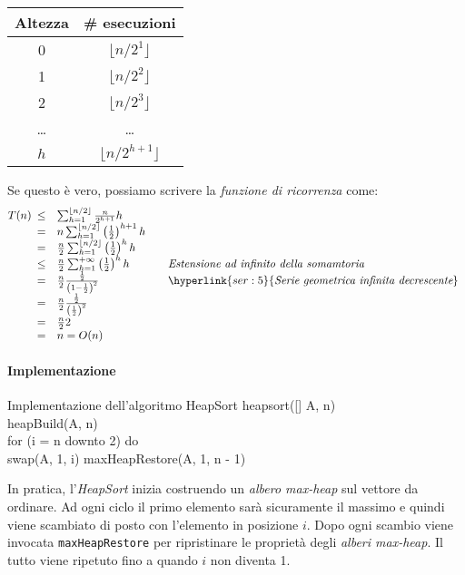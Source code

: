 \begin{table}[h!]
    \centering
    \renewcommand{\arraystretch}{1.2}
    \begin{tabular}{|c|c|}
        \hline
        \textbf{Altezza} & \textbf{\# esecuzioni}\\
        \hline
        0 & $\lfloor n/2^1\rfloor$\\
        \hline
        1 & $\lfloor n/2^2\rfloor$\\
        \hline
        2 & $\lfloor n/2^3\rfloor$\\
        \hline
        \dots & \dots\\
        \hline
        $h$ & $\lfloor n/2^{h+1}\rfloor$\\
        \hline
    \end{tabular}
\end{table}\noindent
Se questo è vero, possiamo scrivere la \emph{funzione di ricorrenza} come:
\[T(n)\begin{array}[t]{cll}
    \leq & \sum_{h=1}^{\lfloor n/2\rfloor}\frac{n}{2^{h+1}}h\\
    = & n\sum_{h=1}^{\lfloor n/2\rfloor}\left(\frac{1}{2}\right)^{h+1}h\\
    = & \frac{n}{2}\sum_{h=1}^{\lfloor n/2\rfloor}\left(\frac{1}{2}\right)^{h}h\\
    \leq & \frac{n}{2}\sum_{h=1}^{+\infty}\left(\frac{1}{2}\right)^{h}h & \quad\emph{Estensione ad infinito della somamtoria}\\
    = & \frac{n}{2}\frac{\frac{1}{2}}{\left(1-\frac{1}{2}\right)^2} & \quad\hyperlink{ser:5}{\emph{Serie geometrica infinita decrescente}}\\
    = & \frac{n}{2}\frac{\frac{1}{2}}{\left(\frac{1}{2}\right)^2}\\
    = & \frac{n}{2}2\\
    = & n = O(n)
\end{array}\]

\paragraph{Implementazione}
\begin{minicode}{Implementazione dell'algoritmo HeapSort}
    \ind heapsort([] A,  n)\\
        heapBuild(A, n)\\
        \indf for (i = n downto 2) do\\
            swap(A, 1, i)\hfill{}
            maxHeapRestore(A, 1, n - 1)\hfill{}
\end{minicode}\noindent
In pratica, l'\emph{HeapSort} inizia costruendo un \emph{albero max-heap} sul
vettore da ordinare. Ad ogni ciclo il primo elemento sarà sicuramente il
massimo e quindi viene scambiato di posto con l'elemento in posizione $i$.
Dopo ogni scambio viene invocata \texttt{maxHeapRestore} per ripristinare le
proprietà degli \emph{alberi max-heap}. Il tutto viene ripetuto fino a quando
$i$ non diventa 1.

